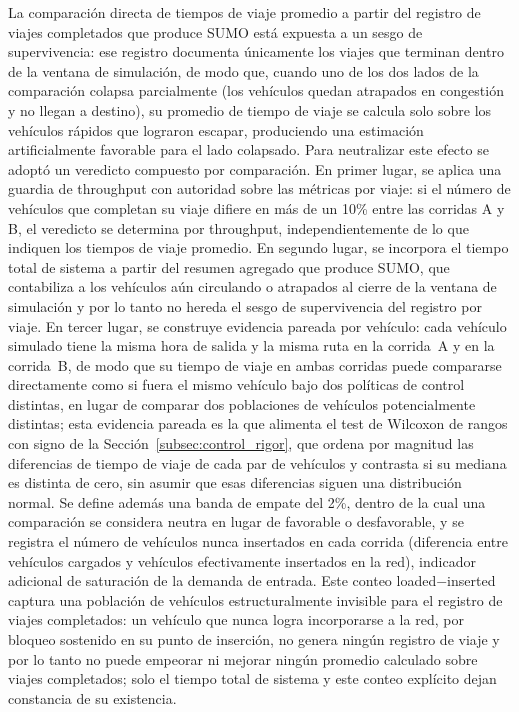 La comparación directa de tiempos de viaje promedio a partir del registro de viajes
completados que produce SUMO está expuesta a un sesgo de supervivencia: ese registro
documenta únicamente los viajes que terminan dentro de la ventana de simulación, de modo
que, cuando uno de los dos lados de la comparación colapsa parcialmente (los vehículos
quedan atrapados en congestión y no llegan a destino), su promedio de tiempo de viaje se
calcula solo sobre los vehículos rápidos que lograron escapar, produciendo una estimación
artificialmente favorable para el lado colapsado. Para neutralizar este efecto se adoptó
un veredicto compuesto por comparación. En primer lugar, se aplica una guardia de
throughput con autoridad sobre las métricas por viaje: si el número de vehículos que
completan su viaje difiere en más de un 10\% entre las corridas A y B, el veredicto se
determina por throughput, independientemente de lo que indiquen los tiempos de viaje
promedio. En segundo lugar, se incorpora el tiempo total de sistema a partir del resumen
agregado que produce SUMO, que contabiliza a los vehículos aún circulando o atrapados al
cierre de la ventana de simulación y por lo tanto no hereda el sesgo de supervivencia del
registro por viaje. En tercer lugar, se construye evidencia pareada por vehículo: cada
vehículo simulado tiene la misma hora de salida y la misma ruta en la corrida~A y en la
corrida~B, de modo que su tiempo de viaje en ambas corridas puede compararse directamente
como si fuera el mismo vehículo bajo dos políticas de control distintas, en lugar de
comparar dos poblaciones de vehículos potencialmente distintas; esta evidencia pareada es
la que alimenta el test de Wilcoxon de rangos con signo de la Sección~\ref{subsec:control_rigor},
que ordena por magnitud las diferencias de tiempo de viaje de cada par de vehículos y
contrasta si su mediana es distinta de cero, sin asumir que esas diferencias siguen una
distribución normal.
Se define además una banda de empate del 2\%, dentro de la cual una comparación se
considera neutra en lugar de favorable o desfavorable, y se registra el número de
vehículos nunca insertados en cada corrida (diferencia entre vehículos cargados y
vehículos efectivamente insertados en la red), indicador adicional de saturación de la
demanda de entrada. Este conteo loaded$-$inserted captura una población de vehículos
estructuralmente invisible para el registro de viajes completados: un vehículo que nunca
logra incorporarse a la red, por bloqueo sostenido en su punto de inserción, no genera
ningún registro de viaje y por lo tanto no puede empeorar ni mejorar ningún promedio
calculado sobre viajes completados; solo el tiempo total de sistema y este conteo
explícito dejan constancia de su existencia.


